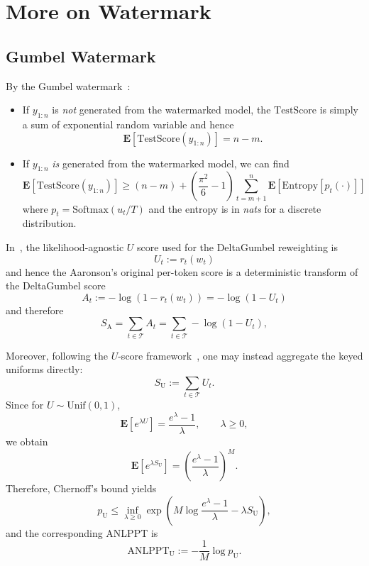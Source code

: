 \documentclass{article}
\theoremstyle{plain}
\theoremstyle{definition}
\begin{document}
\section{More on Watermark}
\label{app::water}




\subsection{Gumbel Watermark}
\label{subapp::gumbel_water}

By the Gumbel watermark~\citep{aaronson2023watermarking}: 
\begin{itemize}
    \item If $y_{1:n}$ is \emph{not} generated from the watermarked model, the $\mathrm{TestScore}$ is simply a sum of exponential random variable and hence 
    \[
    \mathbf{E}\left[ \mathrm{TestScore} (y_{1:n}) \right] = n - m.
    \]

    \item If $y_{1:n}$ \emph{is} generated from the watermarked model, we can find 
    \[
    \mathbf{E}\left[ \mathrm{TestScore} (y_{1:n}) \right] \geq (n - m) + \left(\frac{\pi^2}{6} - 1 \right) \sum^n_{t = m + 1} 
    \mathbf{E}\left[
    \mathrm{Entropy}[p_t(\cdot)]
     \right]
    \]
    where $p_t = \mathrm{Softmax}(u_t/T)$ and the entropy is in \emph{nats} for a discrete distribution. 
\end{itemize}

In~\citep{hu2024inevitable}, the likelihood-agnostic $U$ score used for the DeltaGumbel reweighting is 
\[
U_t
:=
r_t(w_t)
\]
and hence the Aaronson’s original per-token score is a deterministic transform of the DeltaGumbel score 
\[
A_t
:=
-\log(1-r_t(w_t))
=
-\log(1-U_t)
\]
and therefore
\[
S_{\mathrm{A}}
=
\sum_{t\in\mathcal{T}} A_t
=
\sum_{t\in\mathcal{T}} -\log(1-U_t),
\]

Moreover, following the $U$-score framework~\citep{hu2024inevitable}, one may instead aggregate the keyed uniforms directly:
\[
S_{\mathrm{U}}
:=
\sum_{t\in\mathcal{T}} U_t.
\]
Since for $U\sim \mathrm{Unif}(0,1)$,
\[
\mathbf{E}[e^{\lambda U}]
=
\frac{e^\lambda-1}{\lambda},
\qquad \lambda\ge 0,
\]
we obtain
\[
\mathbf{E}[e^{\lambda S_{\mathrm{U}}}]
=
\left(\frac{e^\lambda-1}{\lambda}\right)^M.
\]
Therefore, Chernoff's bound yields
\[
p_{\mathrm{U}}
\le
\inf_{\lambda\ge 0}
\exp \left(
M\log\frac{e^\lambda-1}{\lambda}
-\lambda S_{\mathrm{U}}
\right),
\]
and the corresponding ANLPPT is
\[
\mathrm{ANLPPT}_{\mathrm{U}}
:=
-\frac{1}{M}\log p_{\mathrm{U}}.
\]
\end{document}
